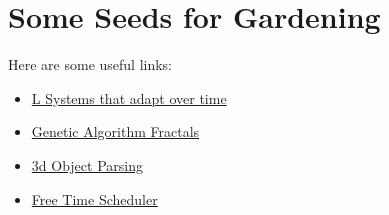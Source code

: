 \chapter{Some Seeds for Gardening}

Here are some useful links:

\begin{itemize}
    \item \href{https://github.com/zoso95/lsystems}{L Systems that adapt over time}
    \item \href{https://github.com/zoso95/genetic-algorithm-fractals}{Genetic Algorithm Fractals}
    \item \href{https://github.com/zoso95/3d-object-parsing}{3d Object Parsing}
    \item \href{https://github.com/zoso95/freetimescheduler}{Free Time Scheduler}
\end{itemize}
